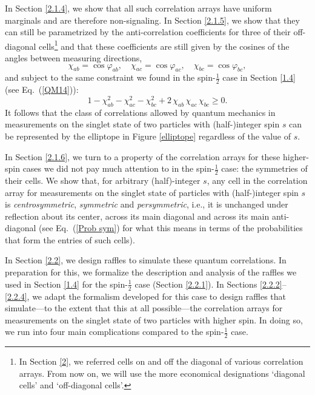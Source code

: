 In Section \ref{2.1.4}, we show that all such correlation arrays have uniform marginals and are therefore non-signaling. In Section \ref{2.1.5}, we show that they can still be parametrized by the anti-correlation coefficients for three of their off-diagonal cells\footnote{In Section \ref{2}, we referred cells on and off the diagonal of various correlation arrays. From now on, we will use the more economical designations `diagonal cells' and `off-diagonal cells'.\label{diag cells economy}} and that these coefficients are still given by the cosines of the angles between measuring directions,
\begin{equation}
\chi_{ab} = \cos{\varphi_{ab}}, \quad \chi_{ac} = \cos{\varphi_{ac}},  \quad \chi_{bc} = \cos{\varphi_{bc}},
\label{intro sec 2a}
\end{equation} 
and subject to the same constraint we found in the spin-$\frac12$ case  in Section \ref{1.4} (see Eq.\ (\ref{QM14})): 
\begin{equation}
1 - \chi_{ab}^2 - \chi_{ac}^2 - \chi_{bc}^2 + 2 \, \chi_{ab} \, \chi_{ac} \, \chi_{bc} \ge 0.
\label{intro sec 2b}
\end{equation}
It follows that the class of correlations allowed by quantum mechanics in measurements on the singlet state of two particles with  (half-)integer spin $s$ can be represented by the elliptope in Figure \ref{elliptope} regardless of the value of $s$.

In Section \ref{2.1.6}, we turn to a property of the correlation arrays for these higher-spin cases we did not pay much attention to in the spin-$\frac12$ case: the symmetries of their cells. We show that, for arbitrary (half)-integer $s$, any cell in the correlation array for measurements on the singlet state of particles with (half-)integer spin $s$ is \emph{centrosymmetric}, \emph{symmetric} and \emph{persymmetric}, i.e., it is unchanged under reflection about its center, across its main diagonal and across its main anti-diagonal (see Eq.\ (\ref{Prob sym}) for what this means in terms of the probabilities that form the entries of such cells). 

In Section \ref{2.2}, we design raffles to simulate these quantum correlations. In preparation for this, we formalize the description and analysis of the raffles we used in Section \ref{1.4} for the spin-$\frac12$ case (Section \ref{2.2.1}). In Sections \ref{2.2.2}--\ref{2.2.4}, we adapt the formalism developed for this case to design raffles that simulate---to the extent that this at all possible---the correlation arrays for measurements on the singlet state of two particles with higher spin. In doing so, we run into four main complications compared to the spin-$\frac12$ case. 

